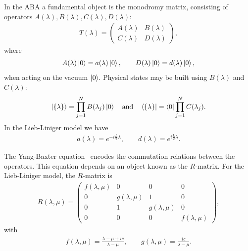 \documentclass[11pt, a4paper]{report} %
\begin{document}
In the ABA a fundamental object is the monodromy matrix, consisting of operators \(A(\lambda), B(\lambda), C(\lambda), D(\lambda)\):
\begin{align}
  \label{eq:31}
  T(\lambda) =
  \begin{pmatrix}
    A(\lambda) & B(\lambda) \\
    C(\lambda) & D(\lambda)
  \end{pmatrix},
\end{align}
where 
\begin{align}
  \label{eq:36}
  A(\lambda) \ket{0} = a(\lambda)\ket{0},\qquad D(\lambda) \ket{0} = d(\lambda)\ket{0},
\end{align}
when acting on the vacuum \(\ket{0}\).
Physical states may be built using \(B(\lambda)\) and \(C(\lambda)\):
\begin{align}
  \label{eq:42}
  \ket{\{\lambda\}} = \prod_{j=1}^{N} B\qty(\lambda_j) \ket{0} \quad \mathrm{and} \quad \bra{\{\lambda\}} = \bra{0} \prod_{j=1}^N C\qty(\lambda_j).
\end{align}
In the Lieb-Liniger model we have~\cite{slavnov89_calcul_scalar_produc_wave_funct,slavnov90_noneq_time_curren_correl_funct}
\begin{align}
  \label{eq:43}
  a(\lambda) = e^{-i\frac{L}{2}\lambda}, \qquad d(\lambda) = e^{i\frac{L}{2}\lambda}.
\end{align}

The Yang-Baxter equation~\cite{Korepin1993} encodes the commutation relations between the operators.
This equation depends on an object known as the \(R\)-matrix.
For the Lieb-Liniger model, the \(R\)-matrix is
\begin{align}
  \label{eq:45}
  R(\lambda,\mu) = 
  \begin{pmatrix}
    f(\lambda, \mu) & 0 & 0 & 0\\
    0 & g(\lambda, \mu) & 1 & 0\\
    0 & 1 & g(\lambda, \mu) & 0 \\
    0 & 0 & 0 & f(\lambda,\mu)
  \end{pmatrix},
\end{align}
with
\begin{align}
  \label{eq:46}
  f(\lambda,\mu) = \frac{\lambda-\mu+ic}{\lambda-\mu}, \qquad g(\lambda,\mu) = \frac{ic}{\lambda-\mu}.
\end{align}
\end{document}
